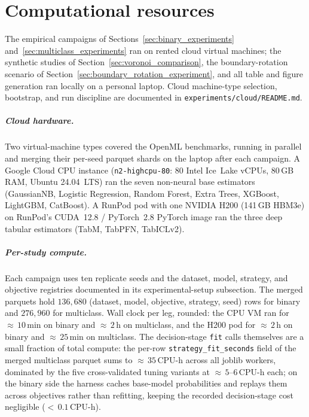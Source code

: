 \chapter{Computational resources}\label{app:compute}

The empirical campaigns of Sections~\ref{sec:binary_experiments} and~\ref{sec:multiclass_experiments} ran on rented cloud virtual machines; the synthetic studies of Section~\ref{sec:voronoi_comparison}, the boundary-rotation scenario of Section~\ref{sec:boundary_rotation_experiment}, and all table and figure generation ran locally on a personal laptop. Cloud machine-type selection, bootstrap, and run discipline are documented in \texttt{experiments/cloud/README.md}.

\paragraph{Cloud hardware.} Two virtual-machine types covered the OpenML benchmarks, running in parallel and merging their per-seed parquet shards on the laptop after each campaign. A Google Cloud CPU instance (\texttt{n2-highcpu-80}: 80 Intel Ice~Lake vCPUs, 80\,GB RAM, Ubuntu 24.04~LTS) ran the seven non-neural base estimators (GaussianNB, Logistic Regression, Random Forest, Extra Trees, XGBoost, LightGBM, CatBoost). A RunPod pod with one NVIDIA H200 (141\,GB HBM3e) on RunPod's CUDA~12.8 / PyTorch~2.8 PyTorch image ran the three deep tabular estimators (TabM, TabPFN, TabICLv2).

\paragraph{Per-study compute.} Each campaign uses ten replicate seeds and the dataset, model, strategy, and objective registries documented in its experimental-setup subsection. The merged parquets hold $136{,}680$ (dataset, model, objective, strategy, seed) rows for binary and $276{,}960$ for multiclass. Wall clock per leg, rounded: the CPU VM ran for ${\approx}\,10\,\text{min}$ on binary and ${\approx}\,2\,\text{h}$ on multiclass, and the H200 pod for ${\approx}\,2\,\text{h}$ on binary and ${\approx}\,25\,\text{min}$ on multiclass. The decision-stage \texttt{fit} calls themselves are a small fraction of total compute: the per-row \texttt{strategy\_fit\_seconds} field of the merged multiclass parquet sums to ${\approx}\,35\,\text{CPU-h}$ across all joblib workers, dominated by the five cross-validated tuning variants at ${\approx}\,5\text{--}6\,\text{CPU-h}$ each; on the binary side the harness caches base-model probabilities and replays them across objectives rather than refitting, keeping the recorded decision-stage cost negligible (${<}\,0.1\,\text{CPU-h}$).

